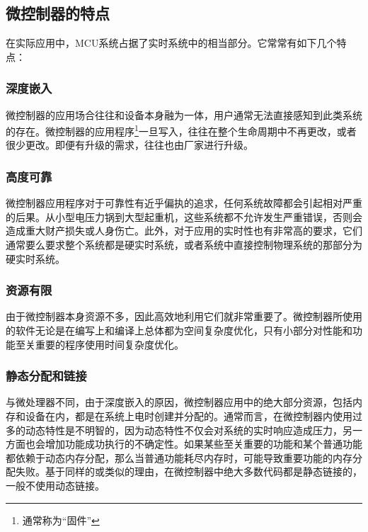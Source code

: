 \subsection{微控制器的特点}\label{subsec:1-1-1}

在实际应用中，MCU系统占据了实时系统中的相当部分。它常常有如下几个特点：

\subsubsection{深度嵌入}\label{subsubsec:1-1-1-1}

微控制器的应用场合往往和设备本身融为一体，用户通常无法直接感知到此类系统的存在。微控制器的应用程序\footnote{通常称为``固件''}一旦写入，往往在整个生命周期中不再更改，或者很少更改。即便有升级的需求，往往也由厂家进行升级。

\subsubsection{高度可靠}\label{subsubsec:1-1-1-2}

微控制器应用程序对于可靠性有近乎偏执的追求，任何系统故障都会引起相对严重的后果。从小型电压力锅到大型起重机，这些系统都不允许发生严重错误，否则会造成重大财产损失或人身伤亡。此外，对于应用的实时性也有非常高的要求，它们通常要么要求整个系统都是硬实时系统，或者系统中直接控制物理系统的那部分为硬实时系统。

\subsubsection{资源有限}\label{subsubsec:1-1-1-3}

由于微控制器本身资源不多，因此高效地利用它们就非常重要了。微控制器所使用的软件无论是在编写上和编译上总体都为空间复杂度优化，只有小部分对性能和功能至关重要的程序使用时间复杂度优化。

\subsubsection{静态分配和链接}\label{subsubsec:1-1-1-4}

与微处理器不同，由于深度嵌入的原因，微控制器应用中的绝大部分资源，包括内存和设备在内，都是在系统上电时创建并分配的。通常而言，在微控制器内使用过多的动态特性是不明智的，因为动态特性不仅会对系统的实时响应造成压力，另一方面也会增加功能成功执行的不确定性。如果某些至关重要的功能和某个普通功能都依赖于动态内存分配，那么当普通功能耗尽内存时，可能导致重要功能的内存分配失败。基于同样的或类似的理由，在微控制器中绝大多数代码都是静态链接的，一般不使用动态链接。

